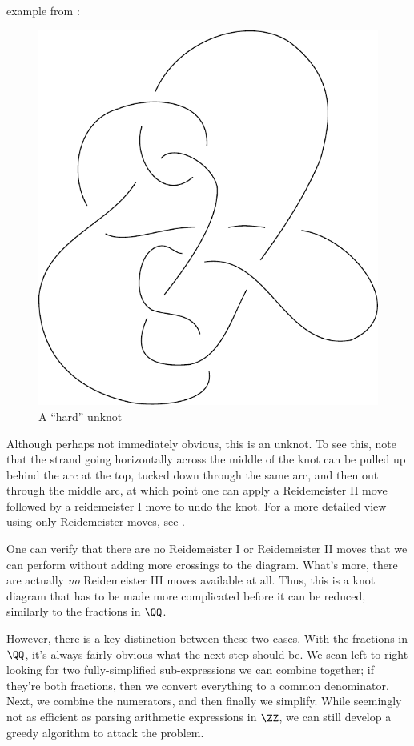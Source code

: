 example from \cite{Kauffman2011Sep}:
\begin{figure}[H]
  \centering
  \includegraphics[scale=.3]{figures/intro/hard-unknot.pdf}
  \caption{A ``hard'' unknot}
\end{figure}
Although perhaps not immediately obvious, this is an unknot. To see
this, note that the strand going horizontally across the middle of the
knot can be pulled up behind the arc at the top, tucked down through
the same arc, and then out through the middle arc, at which point one
can apply a Reidemeister II move followed by a reidemeister I move to
undo the knot. For a more detailed view using only Reidemeister moves,
see \cite{Kauffman2011Sep}.

One can verify that there are no Reidemeister I or Reidemeister II
moves that we can perform without adding more crossings to the
diagram. What's more, there are actually \emph{no} Reidemeister III
moves available at all. Thus, this is a knot diagram that has to be
made more complicated before it can be reduced, similarly to the
fractions in $\QQ$.

However, there is a key distinction between these two cases. With the
fractions in $\QQ$, it's always fairly obvious what the next step
should be. We scan left-to-right looking for two fully-simplified
sub-expressions we can combine together; if they're both fractions,
then we convert everything to a common denominator. Next, we combine
the numerators, and then finally we simplify. While seemingly not as
efficient as parsing arithmetic expressions in $\ZZ$, we can still
develop a {greedy algorithm} to attack the problem.

